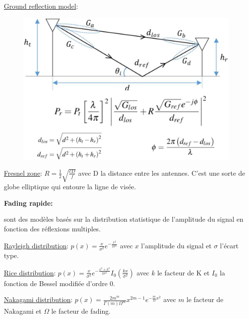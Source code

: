 \underline{Ground reflection model}:

\begin{figure}[H]
    \includegraphics[width=\linewidth]{images/ground_reflection_model.png}
\end{figure}

\underline{Fresnel zone}: $R=\frac{1}{2}\sqrt{\frac{cD}{f}}$ avec D la distance entre les antennes.
C'est une sorte de globe elliptique qui entoure la ligne de visée.

\textbf{Fading rapide:}

sont des modèles basés sur la distribution statistique de l'amplitude
du signal en fonction des réflexions multiples.

\underline{Rayleigh distribution}: $p(x)=\frac{x}{\sigma^2}e^{-\frac{x^2}{2\sigma^2}}$ avec $x$
l'amplitude du signal et $\sigma$ l'écart type.

\underline{Rice distribution}: $p(x)=\frac{x}{\sigma^2}e^{-\frac{x^2+k^2}{2\sigma^2}}I_0\left(\frac{kx}{\sigma^2}\right)$
avec $k$ le facteur de K et $I_0$ la fonction de Bessel modifiée d'ordre 0.

\underline{Nakagami distribution}: $p(x)=\frac{2m^m}{\Gamma(m)\Omega^m}x^{2m-1}e^{-\frac{m}{\Omega}x^2}$
avec $m$ le facteur de Nakagami et $\Omega$ le facteur de fading.

